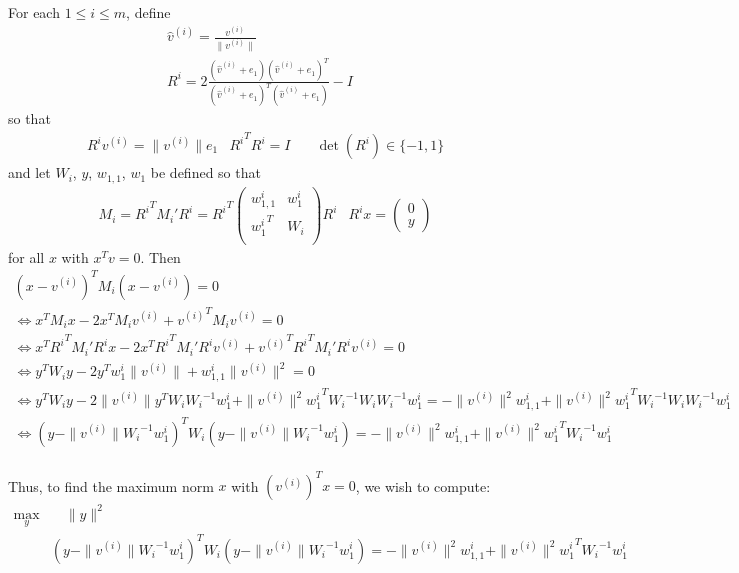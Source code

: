 \documentclass{article}
\theoremstyle{case}
\numberwithin{theorem}{subsection}
\begin{document}
For each $1 \le i \le m$, define
\begin{align*}
\hat v^{(i)} = \frac{v^{(i)}}{\|v^{(i)}\|} \\
R^i = 2\frac{(\hat v^{(i)} + e_1)(\hat v^{(i)} + e_1)^T}{(\hat v^{(i)} + e_1)^T(\hat v^{(i)} + e_1)} - I
\end{align*}
so that
\begin{align*}
& {R^i}v^{(i)} = \|v^{(i)}\|e_1 & {R^i}^T{R^i} = I & \quad \det({R^i}) \in \{-1, 1\}
\end{align*}
and let $W_i$, $y$, $w_{1,1}$, $w_1$ be defined so that
\begin{align*}
& M_i = {R^i}^T M_i' {R^i} = {R^i}^T\left( \begin{array}{cc}
{w_{1,1}^i} & {w_1^i} \\
{w_1^i}^T	& {W_i}  \\
\end{array} \right){R^i} &
{R^i}x = \left(\begin{array}{c}
0 \\
y
\end{array}\right)
\end{align*}
for all $x$ with $x^Tv = 0$.
Then
\begin{align*}
\left(x - {v^{(i)}}\right)^TM_i\left(x - {v^{(i)}}\right) = 0 \\
\Longleftrightarrow x^TM_ix - 2x^TM_i{v^{(i)}} + {v^{(i)}}^TM_i{v^{(i)}} = 0 \\
\Longleftrightarrow x^T{R^i}^TM_i'{R^i}x - 2x^T{R^i}^TM_i'{R^i}{v^{(i)}} + {v^{(i)}}^T{R^i}^TM_i'{R^i}{v^{(i)}} = 0 \\
\Longleftrightarrow y^T{W_i}y - 2y^T{w_1^i}\|v^{(i)}\| + {w_{1,1}^i}\|v^{(i)}\|^2 = 0 \\
\Longleftrightarrow y^T{W_i}y - 2\|v^{(i)}\|y^T{W_i}{W_i}^{-1}{w_1^i} + \|v^{(i)}\|^2{{w_1^i}}^T{W_i}^{-1}{W_i}{W_i}^{-1}{w_1^i} = - \|v^{(i)}\|^2{w_{1,1}^i} + \|v^{(i)}\|^2{{w_1^i}}^T{W_i}^{-1}{W_i}{W_i}^{-1}{w_1^i} \\
\Longleftrightarrow \left(y - \|v^{(i)}\|{W_i}^{-1}{w_1^i}\right)^T{W_i}\left(y - \|v^{(i)}\|{W_i}^{-1}{w_1^i}\right) = - \|v^{(i)}\|^2{w_{1,1}^i} + \|v^{(i)}\|^2{{{w_1^i}}}^T{W_i}^{-1}{{w_1^i}} \\
\end{align*}

Thus, to find the maximum norm $x$ with $\left(v^{(i)}\right)^Tx = 0$, we wish to compute:
\begin{align*}
\max_{y} & \quad \|y\|^2  \\
 & \left(y - \|v^{(i)}\|{W_i}^{-1}{w_1^i}\right)^T{W_i}\left(y - \|v^{(i)}\|{W_i}^{-1}{w_1^i}\right) = - \|v^{(i)}\|^2{w_{1,1}^i} + \|v^{(i)}\|^2{{w_1^i}}^T{W_i}^{-1}{w_1^i}
\end{align*}
\end{document}

